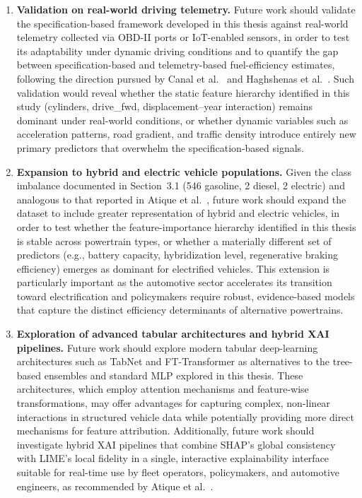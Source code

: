 \begin{enumerate}
    \item \textbf{Validation on real-world driving telemetry.} Future work should validate the specification-based framework developed in this thesis against real-world telemetry collected via OBD-II ports or IoT-enabled sensors, in order to test its adaptability under dynamic driving conditions and to quantify the gap between specification-based and telemetry-based fuel-efficiency estimates, following the direction pursued by Canal et al.~\cite{canal2024machine} and Haghshenas et al.~\cite{haghshenas2025fuel}. Such validation would reveal whether the static feature hierarchy identified in this study (cylinders, drive\_fwd, displacement--year interaction) remains dominant under real-world conditions, or whether dynamic variables such as acceleration patterns, road gradient, and traffic density introduce entirely new primary predictors that overwhelm the specification-based signals.

    \item \textbf{Expansion to hybrid and electric vehicle populations.} Given the class imbalance documented in Section~3.1 (546 gasoline, 2 diesel, 2 electric) and analogous to that reported in Atique et al.~\cite{atique2026explainable}, future work should expand the dataset to include greater representation of hybrid and electric vehicles, in order to test whether the feature-importance hierarchy identified in this thesis is stable across powertrain types, or whether a materially different set of predictors (e.g., battery capacity, hybridization level, regenerative braking efficiency) emerges as dominant for electrified vehicles. This extension is particularly important as the automotive sector accelerates its transition toward electrification and policymakers require robust, evidence-based models that capture the distinct efficiency determinants of alternative powertrains.

    \item \textbf{Exploration of advanced tabular architectures and hybrid XAI pipelines.} Future work should explore modern tabular deep-learning architectures such as TabNet and FT-Transformer as alternatives to the tree-based ensembles and standard MLP explored in this thesis. These architectures, which employ attention mechanisms and feature-wise transformations, may offer advantages for capturing complex, non-linear interactions in structured vehicle data while potentially providing more direct mechanisms for feature attribution. Additionally, future work should investigate hybrid XAI pipelines that combine SHAP's global consistency with LIME's local fidelity in a single, interactive explainability interface suitable for real-time use by fleet operators, policymakers, and automotive engineers, as recommended by Atique et al.~\cite{atique2026explainable}.
\end{enumerate}

